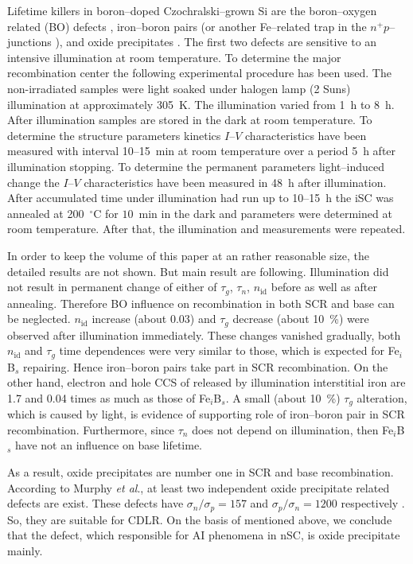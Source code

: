 \documentclass[aip,jap, amsmath,amssymb,reprint]{revtex4-1}
\begin{document}
Lifetime killers  in boron--doped Czochralski--grown Si are the  boron--oxygen related (BO) defects \cite{LIDRev,LIDRev2}, iron--boron pairs \cite{MurphyJAP2011,FeB:Vahanissi,FeB:Schmidt} (or another Fe--related trap in the $n^+p$--junctions \cite{TeimurazPSS,TeimurazJAP}), and oxide precipitates \cite{MurphySC2014,Oxide_Schon,MurphyJAP2011,MurphyJAP2012,Oxide:Chen,Oxide:Porrini}.
The first two defects are sensitive to an intensive illumination at room temperature.
To determine the major recombination center the following experimental procedure has been used.
The non-irradiated samples were light soaked under halogen lamp (2 Suns) illumination at approximately 305~K.
The illumination varied from 1~h to 8~h.
After illumination samples are stored in the dark at room temperature.
To determine the structure parameters kinetics $I$--$V$ characteristics have been measured with interval 10--15~min at room temperature over a period 5~h after illumination stopping.
To determine the permanent parameters light--induced change the $I$--$V$ characteristics have been measured in 48~h after illumination.
After accumulated time under illumination had run up to 10--15~h the iSC was annealed at 200~$^\circ$C for $10$~min in the dark and parameters were determined at room temperature.
After that, the illumination and measurements were repeated.

In order to keep the volume of this paper at an rather reasonable size, the detailed results are not shown.
But main result are following.
Illumination did not result in permanent change of either of $\tau_g$, $\tau_n$, $n_{\mathrm{id}}$ before as well as after annealing.
Therefore BO influence on recombination in both SCR and base can be neglected.
$n_{\mathrm{id}}$ increase (about 0.03) and $\tau_g$ decrease (about 10~\%) were observed after illumination immediately.
These changes vanished gradually, both $n_{\mathrm{id}}$ and $\tau_g$ time dependences were very similar to those, which is expected \cite{FeB:Schmidt} for Fe$_i$B$_s$ repairing.
Hence iron--boron pairs take part in SCR recombination.
On the other hand, electron and hole CCS of released by illumination interstitial iron are 1.7 and 0.04 times \cite{FeB:Schmidt} as much as those of Fe$_i$B$_s$.
A small (about 10~\%) $\tau_g$ alteration, which is caused by light, is evidence of supporting role of iron--boron pair in SCR recombination.
Furthermore, since $\tau_n$ does not depend on illumination, then Fe$_i$B$_s$ have not an influence on base lifetime.

As a result, oxide precipitates are number one in SCR and base recombination.
According to Murphy \emph{et al}.\cite{MurphySC2014,MurphyJAP2012},
at least two independent oxide precipitate related defects are exist.
These defects have $\sigma_n/\sigma_p=157$ and $\sigma_p/\sigma_n=1200$ respectively \cite{MurphyJAP2012}.
So, they are suitable for CDLR.
On the basis of mentioned above, we conclude that the defect, which responsible for AI phenomena in nSC, is oxide precipitate mainly.
\end{document}
